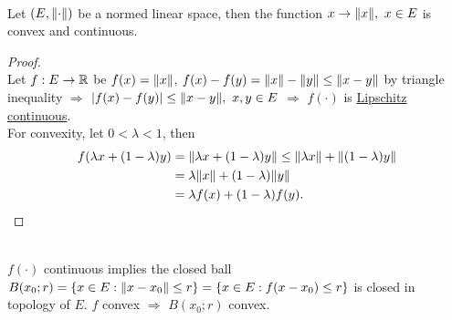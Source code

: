 \begin{proposition}\ \\
Let $(E, \norm{\cdot})$ be a normed linear space, then the function $x \to \norm{x},\ x \in E$ is convex and continuous. 
\end{proposition}
\begin{proof}\ \\
    Let $f: E \to \mathbb{R}$ be $f(x) = \norm{x}$, $f(x) - f(y) = \norm{x} - \norm{y} \leq \norm{x - y}$ by triangle inequality $\Rightarrow$ $\abs{f(x) - f(y)} \leq \norm{x - y},\ x,y \in E$ $\Rightarrow$ $f(\cdot)$ is \underline{Lipschitz continuous}.\\
    For convexity, let $0 < \lambda < 1$, then
    \begin{align*}
        f(\lambda x + (1 - \lambda)y) &= \norm{\lambda x + (1-\lambda )y} \leq \norm{\lambda x} + \norm{(1 - \lambda)y} \\&= \lambda \norm{x} + (1 - \lambda)\norm{y}\\ &= \lambda f(x) + (1-\lambda) f(y).
    \end{align*}
\end{proof}
\begin{remark}\ \\
$f(\cdot)$ continuous implies the closed ball $B(x_0; r) = \{x \in E: \norm{x - x_0} \leq r\} = \{x \in E: f(x - x_0) \leq r\}$ is closed in topology of $E$. $f$ convex $\Rightarrow$ $B(x_0;r)$ convex.
\end{remark}
